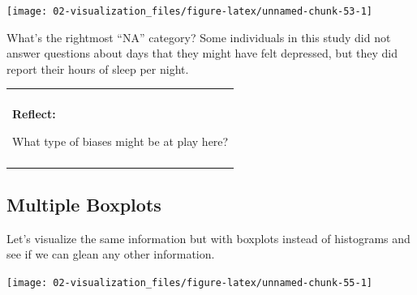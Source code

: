 \documentclass[
]{book}
\newenvironment{Shaded}{\begin{snugshade}}{\end{snugshade}}
\newcommand{\DataTypeTok}[1]{\textcolor[rgb]{0.13,0.29,0.53}{#1}}
\newcommand{\KeywordTok}[1]{\textcolor[rgb]{0.13,0.29,0.53}{\textbf{#1}}}
\newcommand{\NormalTok}[1]{#1}
\newcommand{\OperatorTok}[1]{\textcolor[rgb]{0.81,0.36,0.00}{\textbf{#1}}}
\newcommand{\StringTok}[1]{\textcolor[rgb]{0.31,0.60,0.02}{#1}}
\newenvironment{reflect}
{
    \begin{center}
    
    \begin{tabular}{|p{0.8\textwidth}|}
    \rowcolor{LightBlue}
    \hline\\
    \rowcolor{LightBlue}
    \textbf{Reflect:}
}
{
    \\\rowcolor{LightBlue}
    \\\hline
    \end{tabular} 
    \end{center}
}
\begin{document}
\begin{center}\texttt{[image: 02-visualization\_files/figure-latex/unnamed-chunk-53-1]} \end{center}

What's the rightmost ``NA'' category? Some individuals in this study did not answer questions about days that they might have felt depressed, but they did report their hours of sleep per night.

\begin{reflect}
What type of biases might be at play here?
\end{reflect}

\hypertarget{multiple-boxplots}{%
\subsection{Multiple Boxplots}\label{multiple-boxplots}}

Let's visualize the same information but with boxplots instead of histograms and see if we can glean any other information.

\begin{Shaded}
\end{Shaded}

\begin{center}\texttt{[image: 02-visualization\_files/figure-latex/unnamed-chunk-55-1]} \end{center}

\begin{Shaded}
\end{Shaded}
\end{document}
